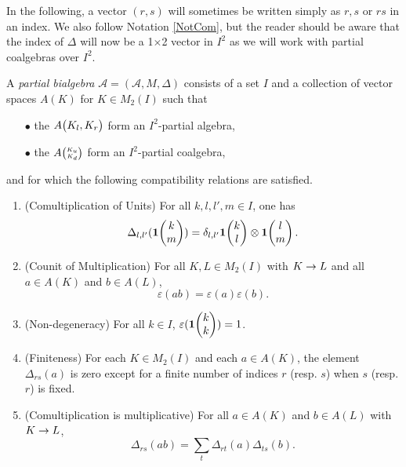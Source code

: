 In the following, a vector $(r,s)$ will sometimes be written simply as $r,s$ or $rs$ in an index. We also follow Notation \ref{NotCom}, but the reader should be aware that the index of $\Delta$ will now be a 1$\times$2 vector in $I^2$ as we will work with partial coalgebras over $I^2$.%
%
\begin{Def}\label{DefPartBiAlg} A \emph{partial bialgebra} $\mathscr{A}=(\mathscr{A},M,\Delta)$ consists of a set $I$ and a collection of vector spaces $A(K)$ for $K\in M_2(I)$ such that 
\begin{itemize}
\item[$\bullet$] the $A{\begin{pmatrix} K_l, K_r\end{pmatrix}}$ form an $I^2$-partial algebra,
\item[$\bullet$] the $A{\tiny {\begin{pmatrix} K_u\\K_d\end{pmatrix}}}$ form an $I^2$-partial coalgebra,
\end{itemize} 
and for which the following compatibility relations are satisfied.
\begin{enumerate}[label=(\alph*)]
\item\label{Propa} (Comultiplication of Units) For all $k,l,l',m\in I$, one has 
\[\Delta_{l,l'}(\mathbf{1}\!\begin{pmatrix} k \\ m\end{pmatrix}) = \delta_{l,l'}\mathbf{1}\!\begin{pmatrix} k \\ l\end{pmatrix}\otimes \mathbf{1}\!\begin{pmatrix} l \\ m\end{pmatrix}.\]  
\item\label{Propb} (Counit of Multiplication) For all $K,L\in M_2(I)$ with $K \rightarrow L$ and all $a\in A(K)$ and $b\in A(L)$, \[\varepsilon(ab) = \varepsilon(a)\varepsilon(b).\]%
\item\label{Propc} (Non-degeneracy) For all $k\in I$, $\varepsilon(\mathbf{1}\!\begin{pmatrix} k \\ k\end{pmatrix})=1$. 
\item\label{Propd} (Finiteness) For each $K\in M_2(I)$ and each $a\in A(K)$, the element $\Delta_{rs}(a)$ is zero except for a finite number of indices $r$ (resp. $s$) when $s$ (resp. $r$) is fixed.
\item\label{Prope} (Comultiplication is multiplicative) For all $a\in A(K)$ and $b\in A(L)$ with $K\rightarrow L$,  \[\Delta_{rs}(ab) = \sum_t \Delta_{rt}(a)\Delta_{ts}(b).\]
\end{enumerate}
\end{Def}

